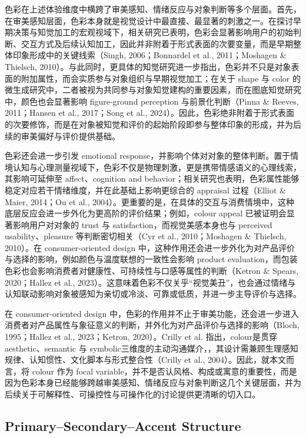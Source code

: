 色彩在上述体验维度中横跨了审美感知、情绪反应与对象判断等多个层面。首先，在审美感知层面，色彩本身就是视觉设计中最直接、最显著的刺激之一。在探讨早期决策与知觉加工的宏观视域下，相关研究已表明，色彩会显著影响用户的初始判断、交互方式及后续认知加工，因此并非附着于形式表面的次要变量，而是早期整体印象形成中的关键线索（Singh, 2006；Bonnardel et al., 2011；Moshagen \& Thielsch, 2010）。与此同时，更具体的知觉研究进一步指出，色彩并不只是对象表面的附加属性，而会实质参与对象组织与早期视觉加工；在关于 shape 与 color 的微生成研究中，二者被视为共同参与对象知觉建构的重要因素，而在图底知觉研究中，颜色也会显著影响 figure-ground perception 与前景化判断（Pinna \& Reeves, 2011；Hansen et al., 2017；Song et al., 2024）。因此，色彩绝非附着于形式表面的次要修饰，而是在对象被知觉和评价的起始阶段即参与整体印象的形成，并为后续的审美偏好与评价提供基础。

色彩还会进一步引发 emotional response，并影响个体对对象的整体判断。置于情境认知与心理测量视域下，色彩不仅是物理刺激，更是携带情感语义的心理线索，其影响可延伸至 affect、cognition and behavior；相关研究也表明，色彩属性能够稳定对应若干情绪维度，并在此基础上影响更综合的 appraisal 过程（Elliot \& Maier, 2014；Ou et al., 2004）。更重要的是，在具体的交互与消费情境中，这种底层反应会进一步外化为更高阶的评价结果；例如，colour appeal 已被证明会显著影响用户对对象的 trust 与 satisfaction，而视觉美感本身也与 perceived usability、pleasure 等判断密切相关（Cyr et al., 2010；Moshagen \& Thielsch, 2010）。在 consumer-oriented design 中，这种作用还会进一步外化为对产品评价与选择的影响，例如颜色与温度联想的一致性会影响 product evaluation，而包装色彩也会影响消费者对健康性、可持续性与口感等属性的判断（Ketron \& Spears, 2020；Hallez et al., 2023）。这意味着色彩不仅关乎“视觉美丑”，也会通过情绪与认知联动影响对象被感知为亲切或冷淡、可靠或低质，并进一步主导评价与选择。

在 consumer-oriented design 中，色彩的作用并不止于审美功能，还会进一步进入消费者对产品属性与象征意义的判断，并外化为对产品评价与选择的影响（Bloch, 1995；Hallez et al., 2023；Ketron, 2020）。Crilly et al. 指出，colour是贯穿aesthetic、semantic 与 symbolic三维度的主动沟通媒介，，其设计需兼顾生理感知规律、认知惯性、文化脚本与形式整合性（Crilly et al., 2004）。因此，就本文而言，将 colour 作为 focal variable，并不是否认风格、构成或寓意的重要性，而是因为色彩本身已经能够跨越审美感知、情绪反应与对象判断这几个关键层面，并为后续关于可解释性、可操控性与可操作化的讨论提供更清晰的切入口。

\subsection{Primary–Secondary–Accent Structure}

